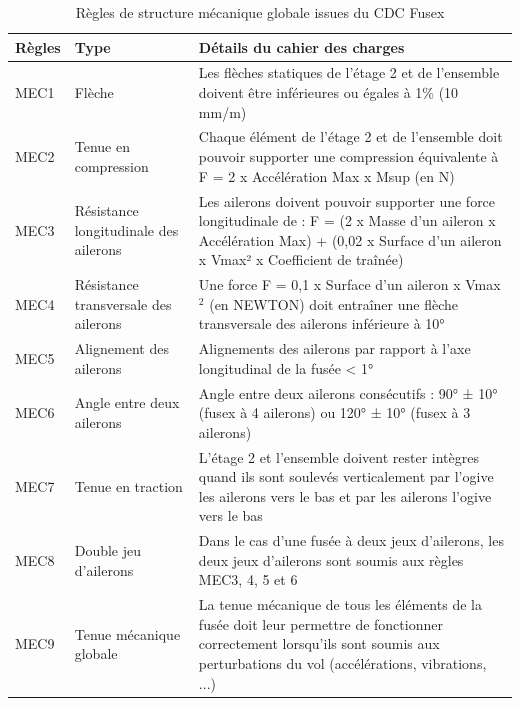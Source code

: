 \begin{table}[h!]
\centering
\begin{tabular}{|p{1.2cm}|p{4cm}|p{10cm}|}
\hline
Règles & Type & Détails du cahier des charges \\ \hline

MEC1  & Flèche & Les flèches statiques de l’étage 2 et de l’ensemble doivent être inférieures ou égales à 1\% (10 mm/m) \\ \hline
MEC2  & Tenue en compression & Chaque élément de l’étage 2 et de l’ensemble doit pouvoir supporter une compression équivalente à F = 2 x Accélération Max x Msup (en N) \\ \hline
MEC3  & Résistance longitudinale des ailerons & Les ailerons doivent pouvoir supporter une force longitudinale de : F = (2 x Masse d’un aileron x Accélération Max) + (0,02 x Surface d’un aileron x Vmax² x Coefficient de traînée) \\ \hline
MEC4  & Résistance transversale des ailerons & Une force F = 0,1 x Surface d’un aileron x Vmax$^2$ (en NEWTON) doit entraîner une flèche transversale des ailerons inférieure à 10° \\ \hline
MEC5  & Alignement des ailerons & Alignements des ailerons par rapport à l’axe longitudinal de la fusée < 1° \\ \hline
MEC6  & Angle entre deux ailerons & Angle entre deux ailerons consécutifs : 90° ± 10° (fusex à 4 ailerons) ou 120° ± 10° (fusex à 3 ailerons) \\ \hline
MEC7  & Tenue en traction & L’étage 2 et l’ensemble doivent rester intègres quand ils sont soulevés verticalement par l'ogive les ailerons vers le bas et par les ailerons l'ogive vers le bas \\ \hline
MEC8  & Double jeu d'ailerons & Dans le cas d’une fusée à deux jeux d’ailerons, les deux jeux d’ailerons sont soumis aux règles MEC3, 4, 5 et 6 \\ \hline
MEC9  & Tenue mécanique globale & La tenue mécanique de tous les éléments de la fusée doit leur permettre de fonctionner correctement lorsqu’ils sont soumis aux perturbations du vol (accélérations, vibrations, ...) \\ \hline

\end{tabular}
\caption{Règles de structure mécanique globale issues du \acrshort{CDC} \gls{Fusex} \cite[p.~32-33]{CDC_BiEtage}}
\end{table}

\newpage
